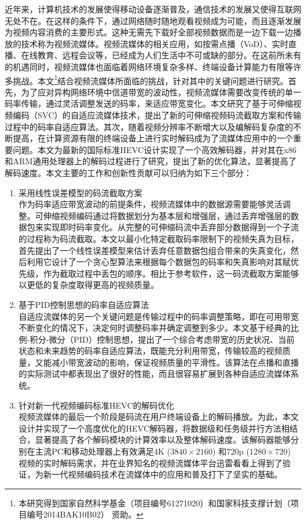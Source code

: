 \begin{cabstract}
近年来，计算机技术的发展使得移动设备逐渐普及，通信技术的发展又使得互联网无处不在。在这样的条件下，通过网络随时随地观看视频成为可能，而且逐渐发展为视频内容消费的主要形式。这种无需先下载好全部视频数据而是一边下载一边播放的技术称为视频流媒体。视频流媒体的相关应用，如按需点播（VoD）、实时直播、在线教育、远程会议等，已经成为人们生活中不可或缺的部分。在这前所未有的机遇同时，视频流媒体也面临着网络环境复杂多样、终端设备计算能力有限等许多挑战。本文\footnote{本研究得到国家自然科学基金（项目编号61271020）和国家科技支撑计划（项目编号2014BAK10B02） 资助。}结合视频流媒体所面临的挑战，针对其中的关键问题进行研究。首先，为了应对异构网络环境中信道带宽的波动性，视频流媒体需要改变传统的单一码率传输，通过灵活调整发送的码率，来适应带宽变化。本文研究了基于可伸缩视频编码（SVC）的自适应流媒体技术，提出了新的可伸缩视频码流截取方案和传输过程中的码率自适应算法。其次，随着视频分辨率不断增大以及编解码复杂度的不断提高，在计算资源有限的终端设备上进行实时解码成为了流媒体应用中的一个重要问题。本文为最新的国际标准HEVC设计实现了一个高效解码器，并对其在x86和ARM通用处理器上的解码过程进行了研究，提出了新的优化算法，显著提高了解码速度。本文主要的工作和创新性贡献可以归纳为如下三个部分：
\begin{enumerate}
\item {采用线性误差模型的码流截取方案}\\
作为码率适应带宽波动的前提条件，视频流媒体中的数据源需要能够灵活调整。可伸缩视频编码通过将数据划分为基本层和增强层，通过丢弃增强层的数据包来实现即时码率变化。从完整的可伸缩码流中丢弃部分数据得到一个子流的过程称为码流截取。本文以最小化特定截取码率限制下的视频失真为目标，首先提出了一个线性误差模型来估计丢弃任意数据包组合带来的失真变化，然后利用它设计了一个贪心型算法来根据每个数据包的码率和失真影响对其赋优先级，作为截取过程中丢包的顺序。相比于参考软件，这一码流截取方案能够以更低的复杂度取得更高的视频质量。
\item {基于PID控制思想的码率自适应算法}\\
自适应流媒体的另一个关键问题是传输过程中的码率调整策略，即在可用带宽不断变化的情况下，决定何时调整码率并确定调整到多少。本文基于经典的比例-积分-微分（PID）控制思想，提出了一个综合考虑带宽的历史状况、当前状态和未来趋势的码率自适应算法，既能充分利用带宽，传输较高的视频质量，又能减小带宽波动的影响，保证视频质量的平滑性。该算法在点播和直播的实际测试中都表现出了很好的性能，而且很容易扩展到各种自适应流媒体系统。
\item {针对新一代视频编码标准HEVC的解码优化}\\
视频流媒体的最后一个阶段是码流在用户终端设备上的解码播放。为此，本文设计并实现了一个高度优化的HEVC解码器，将数据级和任务级并行方法相结合，显著提高了各个解码模块的计算效率以及整体解码速度。该解码器能够分别在主流PC和移动处理器上有效满足4K ($3840 \times 2160$) 和720p ($1280 \times 720$) 视频的实时解码需求，并在业界知名的视频流媒体平台迅雷看看上得到了验证，为新一代视频编码技术在流媒体中的应用和普及打下了坚实的基础。 
\end{enumerate}
\end{cabstract}

